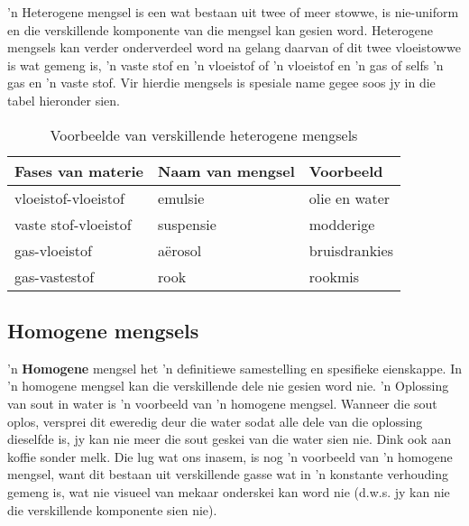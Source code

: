 \label{m38708*fhsst!!!underscore!!!id89}\Definition{\label{id2405839} { Heterogene mengsel }} 
{ \label{m38708*meaningfhsst!!!underscore!!!id89}
        'n Heterogene mengsel is een wat bestaan uit twee of meer stowwe, is nie-uniform en die verskillende komponente van die mengsel kan gesien word.
         } 
Heterogene mengsels kan verder onderverdeel word na gelang daarvan of dit twee vloeistowwe is wat gemeng is, 'n vaste stof en 'n vloeistof of 'n vloeistof en 'n gas of selfs 'n gas en 'n vaste stof. Vir hierdie mengsels is spesiale name gegee soos jy in die tabel hieronder sien.   \par
\begin{table}[h!]
 \begin{center}
  \begin{tabular}{|l|l|l|}\hline
   \textbf{Fases van materie} & \textbf{Naam van mengsel} & \textbf{Voorbeeld} \\ \hline
   vloeistof-vloeistof & emulsie & olie en water \\ \hline
   vaste stof-vloeistof & suspensie & modderige \\ \hline
   gas-vloeistof & a\"erosol & bruisdrankies \\ \hline
   gas-vastestof & rook & rookmis \\ \hline
  \end{tabular}

 \end{center}
\caption{Voorbeelde van verskillende heterogene mengsels}
\label{tab:mixtures}
\end{table}

      \label{m38708*uid6}
            \subsection*{Homogene mengsels}
            \nopagebreak
        \label{m38708*id62762} 'n \textbf{Homogene} mengsel het 'n definitiewe samestelling en spesifieke eienskappe. In 'n homogene mengsel kan die verskillende dele nie gesien word nie. 'n Oplossing van sout in water is 'n voorbeeld van 'n homogene mengsel. Wanneer die sout oplos, versprei dit eweredig deur die water sodat alle dele van die oplossing dieselfde is, jy kan nie meer die sout geskei van die water sien nie. Dink ook aan koffie sonder melk. Die lug wat ons inasem, is nog 'n voorbeeld van 'n homogene mengsel, want dit bestaan uit verskillende gasse wat in 'n konstante verhouding gemeng is, wat nie visueel van mekaar onderskei kan word nie (d.w.s. jy kan nie die verskillende komponente sien nie).\par 

